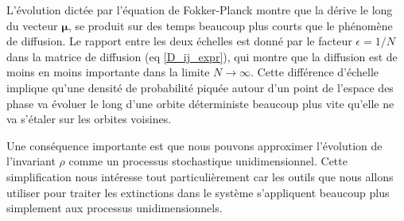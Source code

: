 \documentclass[openany,a4paper,12pt]{article}
\begin{document}
\par L'évolution dictée par l'équation de Fokker-Planck montre que la dérive le long du vecteur $\boldsymbol \mu$, se produit sur des temps beaucoup plus courts que le phénomène de diffusion. Le rapport entre les deux échelles est donné par le facteur $\epsilon = 1/N$ dans la matrice de diffusion (eq \ref{D_ij_expr}), qui montre que la diffusion est de moins en moins importante dans la limite $N\rightarrow\infty$. Cette différence d'échelle implique qu'une densité de probabilité piquée autour d'un point de l'espace des phase va évoluer le long d'une orbite déterministe beaucoup plus vite qu'elle ne va s'étaler sur les orbites voisines.

\par Une conséquence importante est que nous pouvons approximer l'évolution de l'invariant $\rho$ comme un processus stochastique unidimensionnel. %
Cette simplification nous intéresse tout particulièrement car les outils que nous allons utiliser pour traiter les extinctions dans le système s'appliquent beaucoup plus simplement aux processus unidimensionnels.
\end{document}
